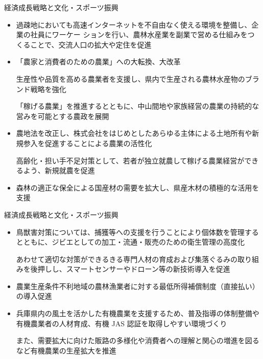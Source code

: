 \documentclass[dvipdfmx]{beamer}
\begin{document}
    \begin{frame}{経済成長戦略と文化・スポーツ振興}{}
        \begin{small}
            \begin{itemize}
                \setlength{\parsep}{.5mm}
                \setlength{\itemsep}{2mm}
                \item 過疎地においても高速インターネットを不自由なく使える環境を整備し、企業の社員にワーケー ションを行い、農林水産業を副業で営める仕組みをつくることで、交流人口の拡大や定住を促進
                \item 「農家と消費者のための農業」への大転換、大改革\par
                生産性や品質を高める農業者を支援し、県内で生産される農林水産物のブランド戦略を強化\par
                「稼げる農業」を推進するとともに、中山間地や家族経営の農業の持続的な営みを可能とする農政を展開
                \item 農地法を改正し、株式会社をはじめとしたあらゆる主体による土地所有や新規参入を促進することによる農業の活性化\par
                高齢化・担い手不足対策として、若者が独立就農して稼げる農業経営ができるよう、新規就農を促進
                \item 森林の適正な保全による国産材の需要を拡大し、県産木材の積極的な活用を支援
            \end{itemize}
        \end{small}
    \end{frame}
    
    \begin{frame}{経済成長戦略と文化・スポーツ振興}{}
        \begin{small}
            \begin{itemize}
                \setlength{\parsep}{.5mm}
                \setlength{\itemsep}{2mm}
                \item 鳥獣害対策については、捕獲等への支援を行うことにより個体数を管理するとともに、ジビエとしての加工・流通・販売のための衛生管理の高度化\par
                あわせて適切な対策ができるきる専門人材の育成および集落ぐるみの取り組みを後押しし、スマートセンサーやドローン等の新技術導入を促進
                \item 農業生産条件不利地域の農林漁業者に対する最低所得補償制度（直接払い）の導入促進
                \item 兵庫県内の風土を活かした有機農業を支援するため、普及指導の体制整備や有機農業者の人材育成、有機 JAS 認証を取得しやすい環境づくり\par
                また、需要拡大に向けた販路の多様化や消費者への理解と関心の増進を図るなど有機農業の生産拡大を推進
            \end{itemize}
        \end{small}
    \end{frame}
    
\end{document}
